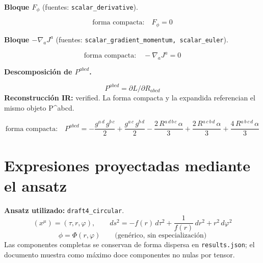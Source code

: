 \documentclass[11pt]{article}
\begin{document}
\par\smallskip\noindent\textbf{Bloque $ F_{\phi} $} (fuentes: \texttt{scalar\_derivative}).\par
\begin{dmath*}[breakdepth={5}]
\text{forma compacta:}\quad F_{\phi} = 0
\end{dmath*}
\par\smallskip\noindent\textbf{Bloque $ -\nabla_a J^a $} (fuentes: \texttt{scalar\_gradient\_momentum, scalar\_euler}).\par
\begin{dmath*}[breakdepth={5}]
\text{forma compacta:}\quad -\nabla_a J^a = 0
\end{dmath*}
\par\medskip\noindent\textbf{Descomposición de $ P^{abcd} $.}\par
\begin{dmath*}[breakdepth={5}]
P^{abcd}=\partial L/\partial R_{abcd}
\end{dmath*}
\textbf{Reconstrucción IR:} verified. La forma compacta y la expandida referencian el mismo objeto P^{abcd}.\par
\begin{dmath*}[breakdepth={5}]
\text{forma compacta:}\quad P^{abcd} = -\frac{g{}^{a\,d}\,g{}^{b\,c}}{2} + \frac{g{}^{a\,c}\,g{}^{b\,d}}{2} - \frac{2\,R{}^{a\,d\,b\,c}\,\alpha}{3} + \frac{2\,R{}^{a\,c\,b\,d}\,\alpha}{3} + \frac{4\,R{}^{a\,b\,c\,d}\,\alpha}{3}
\end{dmath*}
\section*{Expresiones proyectadas mediante el ansatz}
\textbf{Ansatz utilizado:} \texttt{draft4\_circular}.
\begin{dmath*}[breakdepth={3}]
(x^\mu)=\left(\tau, r, \varphi\right),\qquad ds^2 = -f\!\left(r\right)\,d\tau^2 + \frac{1}{f\!\left(r\right)}\,dr^2 + {r}^{2}\,d\varphi^2
\end{dmath*}
\begin{dmath*}[breakdepth={3}]
\phi = \Phi\!\left(r, \varphi\right)\qquad\text{(genérico, sin especialización)}
\end{dmath*}
Las componentes completas se conservan de forma dispersa en \texttt{results.json}; el documento muestra como máximo doce componentes no nulas por tensor.
\end{document}
